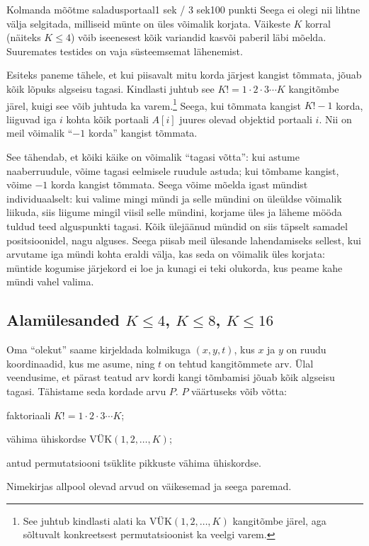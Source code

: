 \begin{yl}{5}{Kolmanda mõõtme saladus}{portaal}{1 sek / 3 sek}{100 punkti}
  Seega ei olegi nii lihtne välja selgitada, milliseid münte on üles võimalik
  korjata. Väikeste $K$ korral (näiteks $K \le 4$) võib iseenesest kõik
  variandid kasvõi paberil läbi mõelda. Suuremates testides on vaja süsteemsemat
  lähenemist.

  Esiteks paneme tähele, et kui piisavalt mitu korda järjest kangist tõmmata,
  jõuab kõik lõpuks algseisu tagasi. Kindlasti juhtub see $K! = 1 \cdot 2 \cdot 3 \cdots K$
  kangitõmbe järel, kuigi see võib juhtuda ka varem.\footnote{See juhtub kindlasti
    alati ka $\text{VÜK}(1, 2, \ldots, K)$ kangitõmbe järel, aga sõltuvalt
    konkreetsest permutatsioonist ka veelgi varem.} Seega, kui tõmmata kangist
  $K! - 1$ korda, liiguvad iga $i$ kohta kõik portaali $A[i]$ juures olevad objektid
  portaali $i$. Nii on meil võimalik ``$-1$ korda'' kangist tõmmata.

  See tähendab, et kõiki käike on võimalik ``tagasi võtta'': kui astume naaberruudule, võime
  tagasi eelmisele ruudule astuda; kui tõmbame kangist, võime $-1$ korda kangist tõmmata.
  Seega võime mõelda igast mündist individuaalselt: kui valime mingi mündi ja selle
  mündini on üleüldse võimalik liikuda, siis liigume mingil viisil selle mündini,
  korjame üles ja läheme mööda tuldud teed alguspunkti tagasi. Kõik ülejäänud
  mündid on siis täpselt samadel positsioonidel, nagu alguses. Seega piisab meil
  ülesande lahendamiseks sellest, kui arvutame iga mündi kohta eraldi välja, kas seda on võimalik
  üles korjata: müntide kogumise järjekord ei loe ja kunagi ei teki olukorda, kus peame
  kahe mündi vahel valima.

  \subsection*{Alamülesanded $K \le 4$, $K \le 8$, $K \le 16$}

  Oma ``olekut'' saame kirjeldada kolmikuga $(x, y, t)$, kus $x$ ja $y$ on ruudu
  koordinaadid, kus me asume, ning $t$ on tehtud kangitõmmete arv. Ülal veendusime,
  et pärast teatud arv kordi kangi tõmbamisi jõuab kõik algseisu tagasi. Tähistame
  seda kordade arvu $P$. $P$ väärtuseks võib võtta:
  \begin{xitem}
  \item faktoriaali $K! = 1 \cdot 2 \cdot 3 \cdots K$;
  \item vähima ühiskordse $\text{VÜK}(1, 2, \ldots, K)$;
  \item antud permutatsiooni tsüklite pikkuste vähima ühiskordse.
  \end{xitem}
  Nimekirjas allpool olevad arvud on väikesemad ja seega paremad.


\end{yl}

